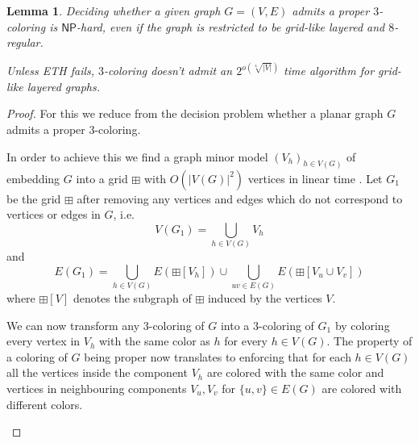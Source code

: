\documentclass[10pt,a4paper]{article}
\numberwithin{equation}{section}
\newtheorem{lemma}[equation]{Lemma}
\theoremstyle{definition}
\newcommand{\NP}{\ensuremath{\mathsf{NP}}}
\begin{document}
\begin{lemma}
    \label{lem:gridlikehardnessregular}
    Deciding whether a given graph $G = (V, E)$ admits a proper $3$-coloring is $\NP$-hard, even if the graph is restricted to be grid-like layered and $8$-regular.
    
    Unless ETH fails, $3$-coloring doesn't admit an $2^{o\left(\sqrt[4]{|V|}\right)}$ time algorithm for grid-like layered graphs.
\end{lemma}
\begin{proof}
    For this we reduce from the decision problem whether a planar graph $G$ admits a proper $3$-coloring.

    In order to achieve this we find a graph minor model $(V_h)_{h\in V(G)}$ of embedding $G$ into a grid $\boxplus$ with $O(|V(G)|^2)$ vertices in linear time \cite{tamassia1989planar}.
    Let $G_1$ be the grid $\boxplus$ after removing any vertices and edges which do not correspond to vertices or edges in $G$, i.e.
    \[
        V(G_1) = \bigcup_{h \in V(G)} V_h
    \]
        and
    \[
        E(G_1) = \bigcup_{h \in V(G)} E(\boxplus[V_h]) \cup \bigcup_{uv \in E(G)} E(\boxplus[V_u \cup V_v])
    \]
    where $\boxplus[V]$ denotes the subgraph of $\boxplus$ induced by the vertices $V$.

    We can now transform any $3$-coloring of $G$ into a $3$-coloring of $G_1$ by coloring every vertex in $V_h$ with the same color as $h$ for every $h \in V(G)$.
    The property of a coloring of $G$ being proper now translates to enforcing that for each $h \in V(G)$ all the vertices inside the component $V_h$ are colored with the same color and vertices in neighbouring components $V_u, V_v$ for $\{u,v\} \in E(G)$ are colored with different colors.

    \begin{figure}[tpb]
        \centering
\end{figure}
\end{proof}
\end{document}
